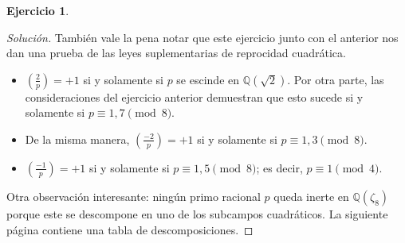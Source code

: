 \documentclass{article}
\newcounter{tarea}
\theoremstyle{definition}
\newtheorem{ejercicio}{Ejercicio}[tarea]
\newenvironment{solucion}{\begin{proof}[Solución]}{\end{proof}}
\newcommand{\legendre}[2]{\left(\frac{#1}{#2}\right)}
\newcommand{\QQ}{\mathbb{Q}}
\begin{document}
\begin{ejercicio}
\begin{solucion}
    También vale la pena notar que este ejercicio junto con el anterior nos dan
    una prueba de las leyes suplementarias de reprocidad cuadrática.
    \begin{itemize}
    \item $\legendre{2}{p} = +1$ si y solamente si $p$ se escinde en
      $\QQ (\sqrt{2})$. Por otra parte, las consideraciones del ejercicio
      anterior demuestran que esto sucede si y solamente si
      $p \equiv 1,7 \pmod{8}$.

    \item De la misma manera, $\legendre{-2}{p} = +1$ si y solamente si
      $p \equiv 1, 3\pmod{8}$.

    \item $\legendre{-1}{p} = +1$ si y solamente si $p \equiv 1, 5\pmod{8}$; es decir, $p \equiv 1 \pmod{4}$.
    \end{itemize}

    Otra observación interesante: ningún primo racional $p$ queda inerte
    en $\QQ (\zeta_8)$ porque este se descompone en uno de los subcampos
    cuadráticos. La siguiente página contiene una tabla de descomposiciones.


\end{solucion}
\end{ejercicio}
\end{document}
